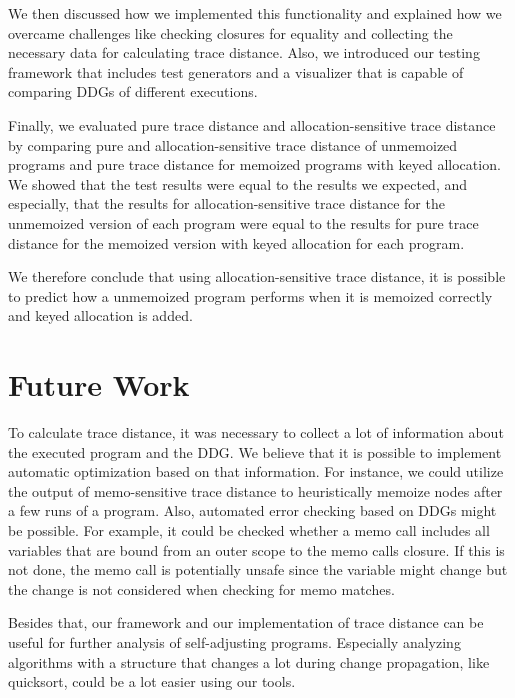 We then discussed how we implemented this functionality and explained how we overcame challenges like checking closures for equality and collecting the necessary data for calculating trace distance. Also, we introduced our testing framework that includes test generators and a visualizer that is capable of comparing DDGs of different executions. 

Finally, we evaluated pure trace distance and allocation-sensitive trace distance by comparing pure and allocation-sensitive trace distance of unmemoized programs and pure trace distance for memoized programs with keyed allocation. We showed that the test results were equal to the results we expected, and especially, that the results for allocation-sensitive trace distance for the unmemoized version of each program were equal to the results for pure trace distance for the memoized version with keyed allocation for each program. 

We therefore conclude that using allocation-sensitive trace distance, it is possible to predict how a unmemoized program performs when it is memoized correctly and keyed allocation is added. 

\section{Future Work}

To calculate trace distance, it was necessary to collect a lot of information about the executed program and the DDG. We believe that it is possible to implement automatic optimization based on that information. For instance, we could utilize the output of memo-sensitive trace distance to heuristically memoize nodes after a few runs of a program. Also, automated error checking based on DDGs might be possible. For example, it could be checked whether a memo call includes all variables that are bound from an outer scope to the memo calls closure. If this is not done, the memo call is potentially unsafe since the variable might change but the change is not considered when checking for memo matches. 

Besides that, our framework and our implementation of trace distance can be useful for further analysis of self-adjusting programs. Especially analyzing algorithms with a structure that changes a lot during change propagation, like quicksort, could be a lot easier using our tools. 


